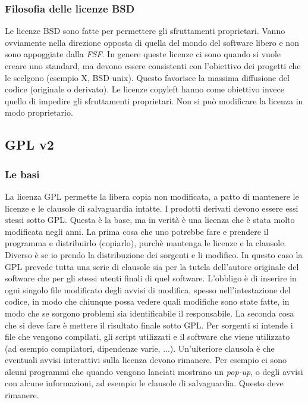 \subsubsection{Filosofia delle licenze BSD}

Le licenze BSD sono fatte per permettere gli sfruttamenti proprietari. Vanno ovviamente nella direzione opposta di quella del mondo del software libero e non sono appoggiate dalla \textit{FSF}. In genere queste licenze ci sono quando si vuole creare uno standard, ma devono essere consistenti con l'obiettivo dei progetti che le scelgono (esempio X, BSD unix). Questo favorisce la massima diffusione del codice (originale o derivato). Le licenze copyleft hanno come obiettivo invece quello di impedire gli sfruttamenti proprietari. Non si può modificare la licenza in modo proprietario. 

\subsection{GPL v2}

\subsubsection{Le basi}

La licenza GPL permette la libera copia non modificata, a patto di mantenere le licenze e le clausole di salvaguardia intatte. I prodotti derivati devono essere essi stessi sotto GPL. Questa è la base, ma in verità è una licenza che è stata molto modificata negli anni. La prima cosa che uno potrebbe fare e prendere il programma e distribuirlo (copiarlo), purchè mantenga le licenze e la clausole. Diverso è se io prendo la distribuzione dei sorgenti e li modifico. In questo caso la GPL prevede tutta una serie di clausole sia per la tutela dell'autore originale del software che per gli stessi utenti finali di quel software. L'obbligo è di inserire in ogni singolo file modificato degli avvisi di modifica, spesso nell'intestazione del codice, in modo che chiunque possa vedere quali modifiche sono state fatte, in modo che se sorgono problemi sia identificabile il responsabile. La seconda cosa che si deve fare è mettere il risultato finale sotto GPL. Per sorgenti si intende i file che vengono compilati, gli script utilizzati e il software che viene utilizzato (ad esempio compilatori, dipendenze varie, ...). Un'ulteriore clausola è che eventuali avvisi interattivi sulla licenza devono rimanere. Per esempio ci sono alcuni programmi che quando vengono lanciati mostrano un \textit{pop-up}, o degli avvisi con alcune informazioni, ad esempio le clausole di salvaguardia. Questo deve rimanere. 

